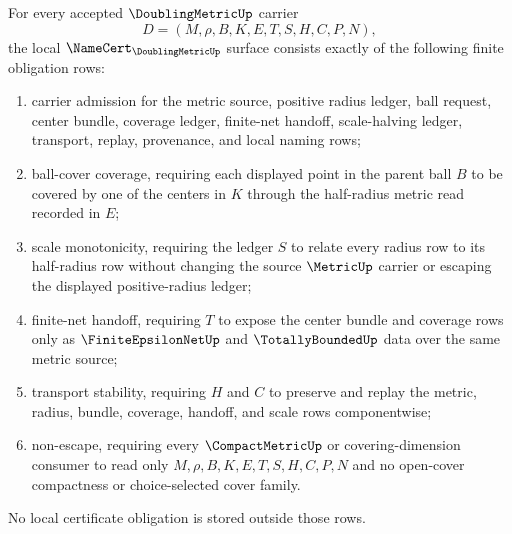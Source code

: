 \begin{theorem}
\label{thm:doubling-metric-namecert-obligations}
For every accepted $\DoublingMetricUp$ carrier
$$
D=(M,\rho,B,K,E,T,S,H,C,P,N),
$$
the local $\NameCert_{\DoublingMetricUp}$ surface consists exactly of the following finite obligation rows:
\begin{enumerate}
\item carrier admission for the metric source, positive radius ledger, ball request, center bundle, coverage ledger, finite-net handoff, scale-halving ledger, transport, replay, provenance, and local naming rows;
\item ball-cover coverage, requiring each displayed point in the parent ball $B$ to be covered by one of the centers in $K$ through the half-radius metric read recorded in $E$;
\item scale monotonicity, requiring the ledger $S$ to relate every radius row to its half-radius row without changing the source $\MetricUp$ carrier or escaping the displayed positive-radius ledger;
\item finite-net handoff, requiring $T$ to expose the center bundle and coverage rows only as $\FiniteEpsilonNetUp$ and $\TotallyBoundedUp$ data over the same metric source;
\item transport stability, requiring $H$ and $C$ to preserve and replay the metric, radius, bundle, coverage, handoff, and scale rows componentwise;
\item non-escape, requiring every $\CompactMetricUp$ or covering-dimension consumer to read only $M,\rho,B,K,E,T,S,H,C,P,N$ and no open-cover compactness or choice-selected cover family.
\end{enumerate}
No local certificate obligation is stored outside those rows.
\end{theorem}
